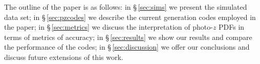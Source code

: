 The outline of the paper is as follows: in \S\,\ref{sec:sims} we present the simulated data set; in \S\,\ref{sec:pzcodes} we describe the current generation codes employed in the paper; in \S\,\ref{sec:metrics} we discuss the interpretation of photo-$z$ PDFs in terms of metrics of accuracy; in \S\,\ref{sec:results} we show our results and compare the performance of the codes; in \S\,\ref{sec:discussion} we offer our conclusions and discuss future extensions of this work.
